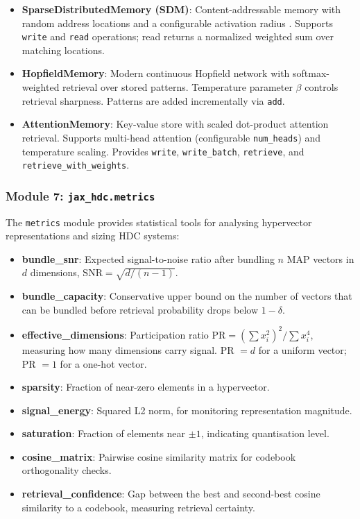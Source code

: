 \documentclass[twoside,11pt]{article}
\begin{document}
\begin{itemize}
\item \textbf{SparseDistributedMemory (SDM)}: Content-addressable memory with random address locations and a configurable activation radius \citep{kanerva1988sparse}. Supports \texttt{write} and \texttt{read} operations; read returns a normalized weighted sum over matching locations.
\item \textbf{HopfieldMemory}: Modern continuous Hopfield network \citep{ramsauer2020hopfield} with softmax-weighted retrieval over stored patterns. Temperature parameter $\beta$ controls retrieval sharpness. Patterns are added incrementally via \texttt{add}.
\item \textbf{AttentionMemory}: Key-value store with scaled dot-product attention retrieval. Supports multi-head attention (configurable \texttt{num\_heads}) and temperature scaling. Provides \texttt{write}, \texttt{write\_batch}, \texttt{retrieve}, and \texttt{retrieve\_with\_weights}.
\end{itemize}

\subsubsection{Module 7: \texttt{jax\_hdc.metrics}}

The \texttt{metrics} module provides statistical tools for analysing hypervector representations and sizing HDC systems:

\begin{itemize}
\item \textbf{bundle\_snr}: Expected signal-to-noise ratio after bundling $n$ MAP vectors in $d$ dimensions, $\text{SNR} = \sqrt{d/(n-1)}$.
\item \textbf{bundle\_capacity}: Conservative upper bound on the number of vectors that can be bundled before retrieval probability drops below $1 - \delta$.
\item \textbf{effective\_dimensions}: Participation ratio $\text{PR} = (\sum x_i^2)^2 / \sum x_i^4$, measuring how many dimensions carry signal.  PR $= d$ for a uniform vector; PR $= 1$ for a one-hot vector.
\item \textbf{sparsity}: Fraction of near-zero elements in a hypervector.
\item \textbf{signal\_energy}: Squared L2 norm, for monitoring representation magnitude.
\item \textbf{saturation}: Fraction of elements near $\pm 1$, indicating quantisation level.
\item \textbf{cosine\_matrix}: Pairwise cosine similarity matrix for codebook orthogonality checks.
\item \textbf{retrieval\_confidence}: Gap between the best and second-best cosine similarity to a codebook, measuring retrieval certainty.
\end{itemize}
\end{document}
